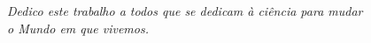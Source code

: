 


\begin{dedicatoria}

	\begin{center}
	
		\vspace*{\fill}
		\textit{Dedico este trabalho a todos que se dedicam à ciência para mudar\\o Mundo em que vivemos.}
		\vspace*{\fill}
	
	\end{center}
	
\end{dedicatoria}